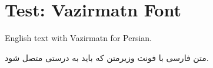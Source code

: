 \documentclass[12pt,a4paper]{article}
\begin{document}
\section*{Test: Vazirmatn Font}

English text with Vazirmatn for Persian.

متن فارسی با فونت وزیرمتن که باید به درستی متصل شود.
\end{document}
